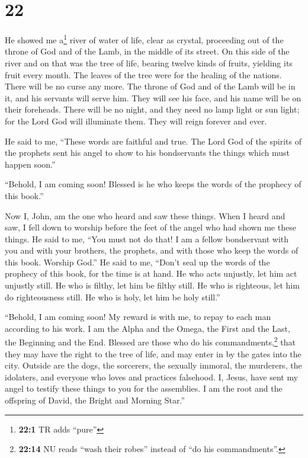 \hypertarget{section-21}{%
\section{22}\label{section-21}}

 He showed me a\footnote{\textbf{22:1} TR adds ``pure''}
river of water of life, clear as crystal, proceeding out of the throne
of God and of the Lamb,  in the middle of its street. On
this side of the river and on that was the tree of life, bearing twelve
kinds of fruits, yielding its fruit every month. The leaves of the tree
were for the healing of the nations.  There will be no
curse any more. The throne of God and of the Lamb will be in it, and his
servants will serve him.  They will see his face, and his
name will be on their foreheads.  There will be no night,
and they need no lamp light or sun light; for the Lord God will
illuminate them. They will reign forever and ever.

 He said to me, ``These words are faithful and true. The
Lord God of the spirits of the prophets sent his angel to show to his
bondservants the things which must happen soon.''

 ``Behold, I am coming soon! Blessed is he who keeps the
words of the prophecy of this book.''

 Now I, John, am the one who heard and saw these things.
When I heard and saw, I fell down to worship before the feet of the
angel who had shown me these things.  He said to me, ``You
must not do that! I am a fellow bondservant with you and with your
brothers, the prophets, and with those who keep the words of this book.
Worship God.''  He said to me, ``Don't seal up the words
of the prophecy of this book, for the time is at hand. 
He who acts unjustly, let him act unjustly still. He who is filthy, let
him be filthy still. He who is righteous, let him do righteousness
still. He who is holy, let him be holy still.''

 ``Behold, I am coming soon! My reward is with me, to
repay to each man according to his work.  I am the Alpha
and the Omega, the First and the Last, the Beginning and the End.
 Blessed are those who do his commandments,\footnote{\textbf{22:14}
  NU reads ``wash their robes'' instead of ``do his commandments''.}
that they may have the right to the tree of life, and may enter in by
the gates into the city.  Outside are the dogs, the
sorcerers, the sexually immoral, the murderers, the idolaters, and
everyone who loves and practices falsehood.  I, Jesus,
have sent my angel to testify these things to you for the assemblies. I
am the root and the offspring of David, the Bright and Morning Star.''

